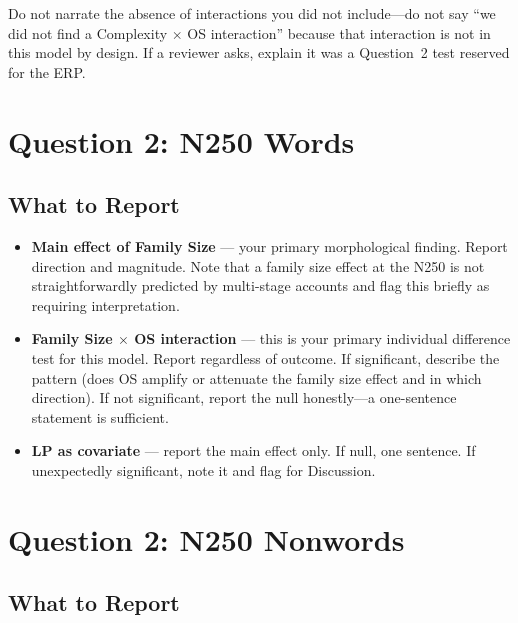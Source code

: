 \documentclass[12pt]{article}
\begin{document}
	Do not narrate the absence of interactions you did not include---do not say ``we did not find a Complexity $\times$ OS interaction'' because that interaction is not in this model by design. If a reviewer asks, explain it was a Question~2 test reserved for the ERP.
	
	\section*{Question 2: N250 Words}
	
	\subsection*{What to Report}
	
	\begin{itemize}
		\item \textbf{Main effect of Family Size} --- your primary morphological finding. Report direction and magnitude. Note that a family size effect at the N250 is not straightforwardly predicted by multi-stage accounts and flag this briefly as requiring interpretation.
		\item \textbf{Family Size $\times$ OS interaction} --- this is your primary individual difference test for this model. Report regardless of outcome. If significant, describe the pattern (does OS amplify or attenuate the family size effect and in which direction). If not significant, report the null honestly---a one-sentence statement is sufficient.
		\item \textbf{LP as covariate} --- report the main effect only. If null, one sentence. If unexpectedly significant, note it and flag for Discussion.
	\end{itemize}
	
	\section*{Question 2: N250 Nonwords}
	
	\subsection*{What to Report}
	
\end{document}
